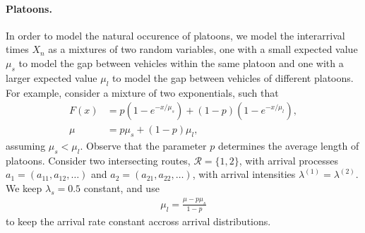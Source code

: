 \documentclass[a4paper]{report}
\theoremstyle{definition}
\theoremstyle{plain}
\begin{document}
%

\paragraph{Platoons.}
In order to model the natural occurence of platoons, we model the interarrival
times $X_{n}$ as a mixtures of two random variables, one with a small expected
value $\mu_{s}$ to model the gap between vehicles within the same platoon and one
with a larger expected value $\mu_{l}$ to model the gap between vehicles of
different platoons. For example, consider a mixture of two exponentials, such
that
\begin{align*}
  F(x) &= p ( 1 - e^{-x / \mu_{s}} ) + (1 - p) (1 - e^{-x / \mu_{l}}) , \\[0.2em]
  \mu &= p \mu_{s} + (1-p) \mu_{l} ,
\end{align*}
%
assuming $\mu_{s} < \mu_{l}$. Observe that the parameter $p$ determines
the average length of platoons.
%
Consider two intersecting routes, $\mathcal{R} = \{1, 2\}$, with arrival processes
$a_{1} = (a_{11}, a_{12}, \dots)$ and $a_{2} = (a_{21}, a_{22}, \dots)$, with
arrival intensities $\lambda^{(1)} = \lambda^{(2)}$.
%
We keep $\lambda_{s} = 0.5$ constant, and use
\begin{align*}
  \mu_{l}  = \frac{\mu - p \mu_{s}}{1 - p}
\end{align*}
to keep the arrival rate constant accross arrival distributions.
\end{document}
